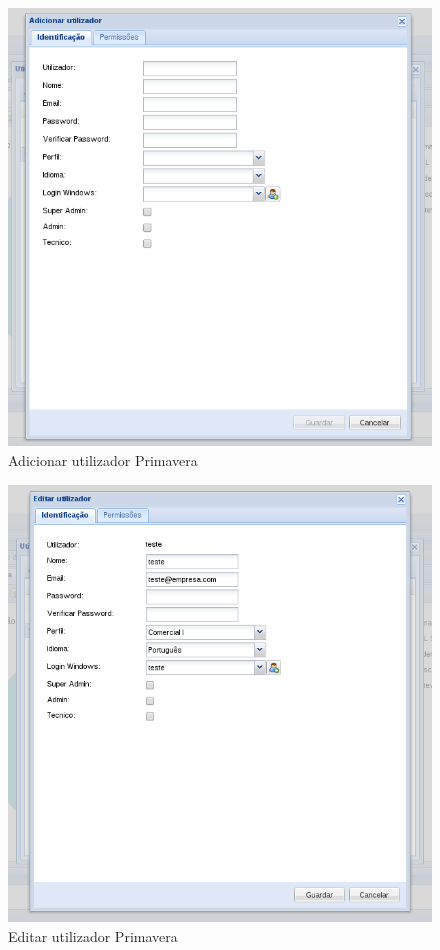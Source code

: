 \begin{figure}[H]
    \begin{center}
    \includegraphics[scale=0.38]{screenshots/primavera/primavera_add_user.png}
    \caption{Adicionar utilizador Primavera}
    \label{fig:primavera_add_user}
    \end{center}
\end{figure}

\begin{figure}[H]
    \begin{center}
    \includegraphics[scale=0.38]{screenshots/primavera/primavera_edit_user.png}
    \caption{Editar utilizador Primavera}
    \label{fig:primavera_edit_user}
    \end{center}
\end{figure}

